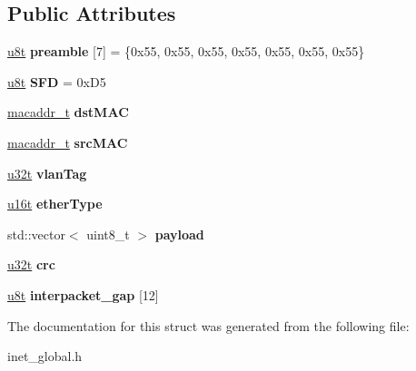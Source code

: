 \subsection*{Public Attributes}
\begin{DoxyCompactItemize}
\item 
\mbox{\label{structeth__vlan__frame__t_a78999322e3f11cb4c7e64f63671c9200}} 
\hyperlink{macros_8h_a176a4ab0531a048e0693a4520c550193}{u8t} {\bfseries preamble} \mbox{[}7\mbox{]} = \{0x55, 0x55, 0x55, 0x55, 0x55, 0x55, 0x55\}
\item 
\mbox{\label{structeth__vlan__frame__t_a69b29b6322d0d6d73939bff432538d06}} 
\hyperlink{macros_8h_a176a4ab0531a048e0693a4520c550193}{u8t} {\bfseries S\+FD} = 0x\+D5
\item 
\mbox{\label{structeth__vlan__frame__t_af65384a13f1fbccc547ffcd5bd1914c1}} 
\hyperlink{structmacaddr__t}{macaddr\+\_\+t} {\bfseries dst\+M\+AC}
\item 
\mbox{\label{structeth__vlan__frame__t_ae08beab62fa2486d9e06746fc62d5ae0}} 
\hyperlink{structmacaddr__t}{macaddr\+\_\+t} {\bfseries src\+M\+AC}
\item 
\mbox{\label{structeth__vlan__frame__t_a2170006324fff8cb5f96172a340ef852}} 
\hyperlink{macros_8h_a464a07ed2c6d005d677113cc44750a64}{u32t} {\bfseries vlan\+Tag}
\item 
\mbox{\label{structeth__vlan__frame__t_ab1a9bcb061996b0a8a384c89ae7477dc}} 
\hyperlink{macros_8h_a590a9a8f7df8fabfac6573e21da1922d}{u16t} {\bfseries ether\+Type}
\item 
\mbox{\label{structeth__vlan__frame__t_a3724d5d625e71ba2008fa1d058b1be76}} 
std\+::vector$<$ uint8\+\_\+t $>$ {\bfseries payload}
\item 
\mbox{\label{structeth__vlan__frame__t_a99ce30cc2b1b0c61306f056e71aa497d}} 
\hyperlink{macros_8h_a464a07ed2c6d005d677113cc44750a64}{u32t} {\bfseries crc}
\item 
\mbox{\label{structeth__vlan__frame__t_aa68bb1e435d49b46770315990b3e2021}} 
\hyperlink{macros_8h_a176a4ab0531a048e0693a4520c550193}{u8t} {\bfseries interpacket\+\_\+gap} \mbox{[}12\mbox{]}
\end{DoxyCompactItemize}


The documentation for this struct was generated from the following file\+:\begin{DoxyCompactItemize}
\item 
inet\+\_\+global.\+h\end{DoxyCompactItemize}

